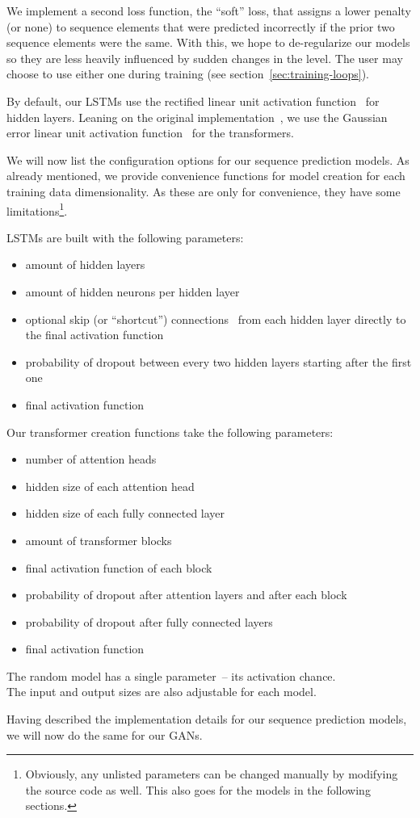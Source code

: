 We implement a second loss function, the ``soft'' loss, that assigns a
lower penalty (or none) to sequence elements that were predicted
incorrectly if the prior two sequence elements were the same. With
this, we hope to de-regularize our models so they are less heavily
influenced by sudden changes in the level. The user may choose to use
either one during training (see section~\ref{sec:training-loops}).

By default, our LSTMs use the rectified linear unit activation
function~\cite{nairRectifiedLinearUnits,RectifierNeuralNetworks2019}
for hidden layers. Leaning on the original
implementation~\cite{OpenaiGpt22019}, we use the Gaussian error linear
unit activation function~\cite{hendrycksGaussianErrorLinear2018} for
the transformers.

We will now list the configuration options for our sequence prediction
models. As already mentioned, we provide convenience functions for
model creation for each training data dimensionality. As these are
only for convenience, they have some limitations\footnote{Obviously,
  any unlisted parameters can be changed manually by modifying the
  source code as well. This also goes for the models in the following
  sections.}.

LSTMs are built with the following parameters:
\begin{itemize}
\item amount of hidden layers
\item amount of hidden neurons per hidden layer
\item optional skip (or ``shortcut'')
  connections~\cite{heDeepResidualLearning2015} from each hidden layer
  directly to the final activation function
\item probability of dropout between every two hidden layers starting
  after the first one
\item final activation function
\end{itemize}
Our transformer creation functions take the following parameters:
\begin{itemize}
\item number of attention heads
\item hidden size of each attention head
\item hidden size of each fully connected layer
\item amount of transformer blocks
\item final activation function of each block
\item probability of dropout after attention layers and after each
  block
\item probability of dropout after fully connected layers
\item final activation function
\end{itemize}
The random model has a single parameter~-- its activation chance. \\
The input and output sizes are also adjustable for each model.

Having described the implementation details for our sequence
prediction models, we will now do the same for our GANs.


